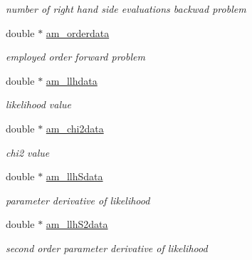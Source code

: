 \begin{DoxyCompactItemize}
\begin{DoxyCompactList}\small\item\em number of right hand side evaluations backwad problem \end{DoxyCompactList}\item 
\hypertarget{struct_return_data_af792e4a1c5c23c5232ef9398e25de1a7}{}double $\ast$ \hyperlink{struct_return_data_af792e4a1c5c23c5232ef9398e25de1a7}{am\+\_\+orderdata}\label{struct_return_data_af792e4a1c5c23c5232ef9398e25de1a7}

\begin{DoxyCompactList}\small\item\em employed order forward problem \end{DoxyCompactList}\item 
\hypertarget{struct_return_data_af95fa143e0e524652f9a818f6288b544}{}double $\ast$ \hyperlink{struct_return_data_af95fa143e0e524652f9a818f6288b544}{am\+\_\+llhdata}\label{struct_return_data_af95fa143e0e524652f9a818f6288b544}

\begin{DoxyCompactList}\small\item\em likelihood value \end{DoxyCompactList}\item 
\hypertarget{struct_return_data_ae0fc05ce8c52bdda5c7bff541c79945d}{}double $\ast$ \hyperlink{struct_return_data_ae0fc05ce8c52bdda5c7bff541c79945d}{am\+\_\+chi2data}\label{struct_return_data_ae0fc05ce8c52bdda5c7bff541c79945d}

\begin{DoxyCompactList}\small\item\em chi2 value \end{DoxyCompactList}\item 
\hypertarget{struct_return_data_af72a5801bf4c6b957812c8b2471ecf41}{}double $\ast$ \hyperlink{struct_return_data_af72a5801bf4c6b957812c8b2471ecf41}{am\+\_\+llh\+Sdata}\label{struct_return_data_af72a5801bf4c6b957812c8b2471ecf41}

\begin{DoxyCompactList}\small\item\em parameter derivative of likelihood \end{DoxyCompactList}\item 
\hypertarget{struct_return_data_a9ea6527fa5408fa1ae074cdbd83ed11f}{}double $\ast$ \hyperlink{struct_return_data_a9ea6527fa5408fa1ae074cdbd83ed11f}{am\+\_\+llh\+S2data}\label{struct_return_data_a9ea6527fa5408fa1ae074cdbd83ed11f}

\begin{DoxyCompactList}\small\item\em second order parameter derivative of likelihood \end{DoxyCompactList}\end{DoxyCompactItemize}


